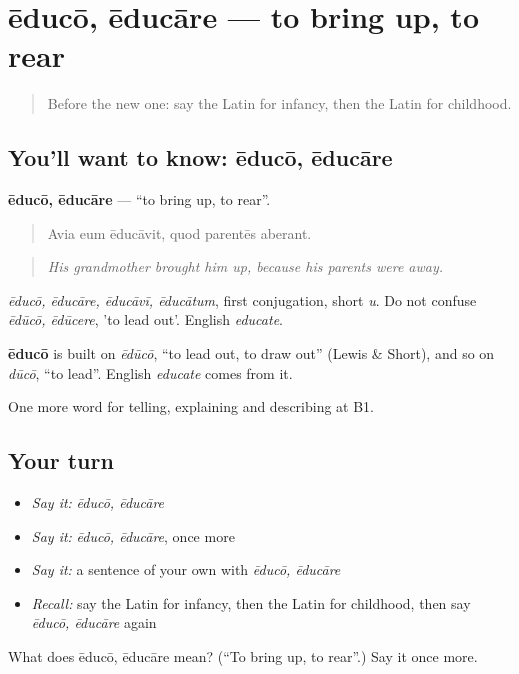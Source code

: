 \section[ēducō, ēducāre]{ēducō, ēducāre — to bring up, to rear}

\label{lesson:LA-C324-educo}



\begin{quote}
Before the new one: say the Latin for infancy, then the Latin for childhood.
\end{quote}

\subsection*{You'll want to know: ēducō, ēducāre}
\textbf{ēducō, ēducāre} — \textquotedblleft{}to bring up, to rear\textquotedblright{}.

\begin{quote}
Avia eum ēducāvit, quod parentēs aberant.
\end{quote}

\begin{quote}
\emph{His grandmother brought him up, because his parents were away.}
\end{quote}

\emph{ēducō, ēducāre, ēducāvī, ēducātum}, first conjugation, short \emph{u}. Do not confuse \emph{ēdūcō, ēdūcere}, 'to lead out'. English \emph{educate}.

\begin{cousinweb}
\textbf{ēducō} is built on \emph{ēdūcō}, \textquotedblleft{}to lead out, to draw out\textquotedblright{} (Lewis \& Short), and so on \emph{dūcō}, \textquotedblleft{}to lead\textquotedblright{}. English \emph{educate} comes from it.
\end{cousinweb}

\begin{grammarlens}[title={What you've built}]
One more word for telling, explaining and describing at B1.
\end{grammarlens}

\subsection*{Your turn}
\begin{itemize}
\raggedright
  \item \emph{Say it:} \emph{ēducō, ēducāre}
  \item \emph{Say it:} \emph{ēducō, ēducāre}, once more
  \item \emph{Say it:} a sentence of your own with \emph{ēducō, ēducāre}
  \item \emph{Recall:} say the Latin for infancy, then the Latin for childhood, then say \emph{ēducō, ēducāre} again
\end{itemize}

\begin{tcolorbox}[breakable,colback=teal!4,colframe=teal!35!black,title={Before you move on}]
What does ēducō, ēducāre mean? (\textquotedblleft{}To bring up, to rear\textquotedblright{}.) Say it once more.
\end{tcolorbox}

